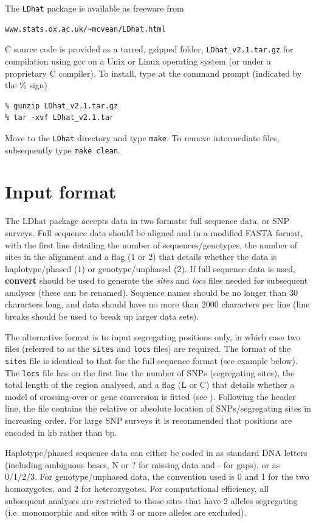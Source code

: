 \documentclass[a4paper,10pt,fullpage]{article}
\begin{document}
The \verb+LDhat+ package is available as freeware from
\begin{verbatim}
www.stats.ox.ac.uk/~mcvean/LDhat.html
\end{verbatim}
\noindent C source code is provided as a tarred, gzipped folder,
\verb+LDhat_v2.1.tar.gz+ for compilation using gcc on a Unix or Linux
operating system (or under a proprietary C compiler).  To install,
type at the command prompt (indicated by the \% sign)
\begin{verbatim}
% gunzip LDhat_v2.1.tar.gz
% tar -xvf LDhat_v2.1.tar
\end{verbatim}
Move to the \verb+LDhat+ directory and type \verb+make+.  To remove
intermediate files, subsequently type \verb+make clean+.


\section{Input format}
The LDhat package accepts data in two formats: full sequence data,
or SNP surveys.  Full sequence data should be aligned and in a
modified FASTA format, with the first line detailing the number of
sequences/genotypes, the number of sites in the alignment and a
flag (1 or 2) that details whether the data is haplotype/phased
(1) or genotype/unphased (2). If full sequence data is used, {\bf
convert} should be used to generate the {\it sites} and {\it locs}
files needed for subsequent analyses (these can be renamed).
Sequence names should be no longer than 30 characters long, and
data should have no more than 2000 characters per line (line
breaks should be used to break up larger data sets).

The alternative format is to input segregating positions only, in
which case two files (referred to as the {\verb+sites+} and {\verb+locs+} files) are required.  The format of the {\verb+sites+} file is
identical to that for the full-sequence format (see example
below).  The {\verb+locs+} file has on the first line the number of
SNPs (segregating sites), the total length of the region analysed,
and a flag (L or C) that details whether a model of crossing-over
or gene conversion is fitted (see \cite{McVeanetal02}).  Following
the header line, the file contains the relative or absolute
location of SNPs/segregating sites in increasing order.  For large
SNP surveys it is recommended that positions are encoded in kb
rather than bp.

Haplotype/phased sequence data can either be coded in as standard
DNA letters (including ambiguous bases, N or ? for missing data
and - for gaps), or as 0/1/2/3.  For genotype/unphased data, the
convention used is 0 and 1 for the two homozygotes, and 2 for
heterozygotes.  For computational efficiency, all subsequent
analyses are restricted to those sites that have 2 alleles
segregating (i.e. monomorphic and sites with 3 or more alleles are
excluded). \\\\
\end{document}
